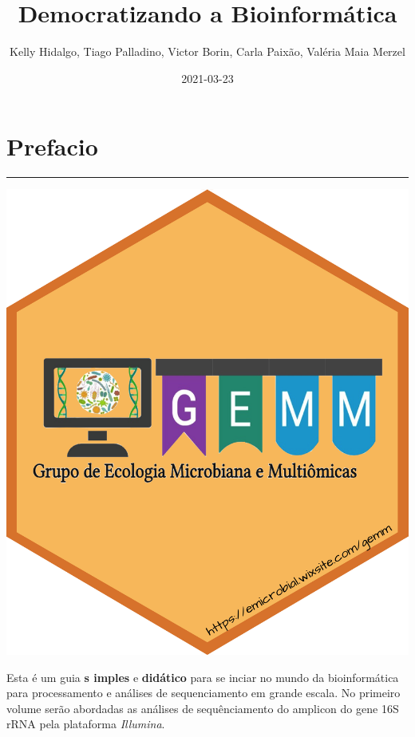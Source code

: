 \documentclass[
]{book}
\title{ Democratizando a Bioinformática}
\author{Kelly Hidalgo, Tiago Palladino, Victor Borin, Carla Paixão, Valéria Maia Merzel}
\date{2021-03-23}
\begin{document}
\maketitle

{
\setcounter{tocdepth}{1}
\tableofcontents
}
\hypertarget{prefacio}{%
\chapter*{Prefacio}\label{prefacio}}

\begin{center}\rule{0.5\linewidth}{0.5pt}\end{center}

\begin{center}\includegraphics[width=1.2\linewidth,height=1.2\textheight]{imgs/1} \end{center}

Esta é um guia \textbf{s imples} e \textbf{didático} para se inciar no mundo da bioinformática para processamento e análises de sequenciamento em grande escala. No primeiro volume serão abordadas as análises de sequênciamento do amplicon do gene 16S rRNA pela plataforma \emph{Illumina}.
\end{document}
